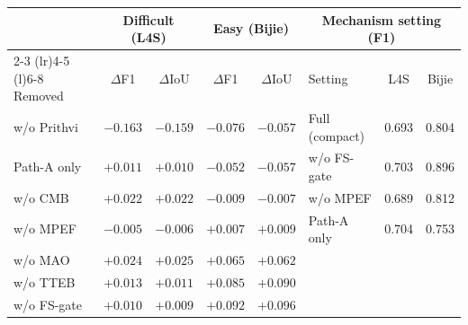 \documentclass[10pt,twocolumn,letterpaper]{article}
\begin{document}
\begin{table}[!t]
\vspace{0.45em}
\setlength{\tabcolsep}{4pt}
\begin{tabular}{lcccc@{\hspace{1.6em}}lcc}
\toprule
& \multicolumn{2}{c}{Difficult (L4S)} & \multicolumn{2}{c}{Easy (Bijie)} &
\multicolumn{3}{c}{Mechanism setting (F1)} \\
\cmidrule(lr){2-3} \cmidrule(lr){4-5} \cmidrule(l){6-8}
Removed & \(\Delta\)F1 & \(\Delta\)IoU & \(\Delta\)F1 & \(\Delta\)IoU & Setting & L4S & Bijie \\
\midrule
w/o Prithvi & $-0.163$ & $-0.159$ & $-0.076$ & $-0.057$ & Full (compact) & 0.693 & 0.804 \\
Path-A only & $+0.011$ & $+0.010$ & $-0.052$ & $-0.057$ & w/o FS-gate & 0.703 & 0.896 \\
w/o CMB & $+0.022$ & $+0.022$ & $-0.009$ & $-0.007$ & w/o MPEF & 0.689 & 0.812 \\
w/o MPEF & $-0.005$ & $-0.006$ & $+0.007$ & $+0.009$ & Path-A only & 0.704 & 0.753 \\
w/o MAO & $+0.024$ & $+0.025$ & $+0.065$ & $+0.062$ & & & \\
w/o TTEB & $+0.013$ & $+0.011$ & $+0.085$ & $+0.090$ & & & \\
w/o FS-gate & $+0.010$ & $+0.009$ & $+0.092$ & $+0.096$ & & & \\
\bottomrule
\end{tabular}
\end{table}
\end{document}
